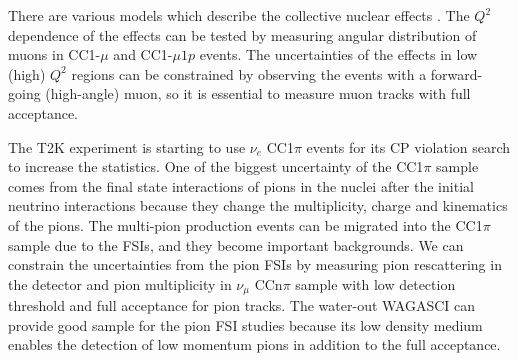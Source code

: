 There are various models which describe the collective nuclear effects \cite{collective_nuclear_effect}.
The $Q^{2}$ dependence of the effects can be tested by measuring angular distribution of muons in CC1-$\mu$ and CC1-$\mu 1p$ events.
The uncertainties of the effects in low (high) $Q^{2}$ regions can be constrained by observing the events with a forward-going (high-angle) muon, so it is essential to measure muon tracks with full acceptance.


The T2K experiment is starting to use $\nu_{e}$ CC1$\pi$ events for its CP violation search to increase the statistics.
One of the biggest uncertainty of the CC1$\pi$ sample comes from the final state interactions of pions in the nuclei after the initial neutrino interactions because they change the multiplicity, charge and kinematics of the pions.
The multi-pion production events can be migrated into the CC1$\pi$ sample due to the FSIs, and they become important backgrounds.
We can constrain the uncertainties from the pion FSIs by measuring pion rescattering in the detector and pion multiplicity in $\nu_{\mu}$ CCn$\pi$ sample with low detection threshold and full acceptance for pion tracks.
The water-out WAGASCI can provide good sample for the pion FSI studies because its low density medium enables the detection of low momentum pions in addition to the full acceptance.

